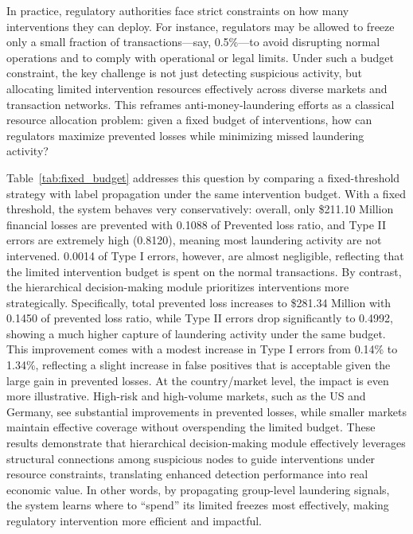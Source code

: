 In practice, regulatory authorities face strict constraints on how many interventions they can deploy. For instance, regulators may be allowed to freeze only a small fraction of transactions—say, 0.5\%—to avoid disrupting normal operations and to comply with operational or legal limits. Under such a budget constraint, the key challenge is not just detecting suspicious activity, but allocating limited intervention resources effectively across diverse markets and transaction networks. This reframes anti-money-laundering efforts as a classical resource allocation problem: given a fixed budget of interventions, how can regulators maximize prevented losses while minimizing missed laundering activity?

Table~\ref{tab:fixed_budget} addresses this question by comparing a fixed-threshold strategy with label propagation under the same intervention budget. With a fixed threshold, the system behaves very conservatively: overall, only \$211.10 Million financial losses are prevented with 0.1088 of Prevented loss ratio, and Type II errors are extremely high (0.8120), meaning most laundering activity are not intervened. 0.0014 of Type I errors, however, are almost negligible, reflecting that the limited intervention budget is spent on the normal transactions. By contrast, the hierarchical decision-making module prioritizes interventions more strategically. Specifically, total prevented loss increases to \$281.34 Million with 0.1450 of prevented loss ratio, while Type II errors drop significantly to 0.4992, showing a much higher capture of laundering activity under the same budget. This improvement comes with a modest increase in Type I errors from 0.14\% to 1.34\%, reflecting a slight increase in false positives that is acceptable given the large gain in prevented losses. At the country/market level, the impact is even more illustrative. High-risk and high-volume markets, such as the US and Germany, see substantial improvements in prevented losses, while smaller markets maintain effective coverage without overspending the limited budget. These results demonstrate that hierarchical decision-making module effectively leverages structural connections among suspicious nodes to guide interventions under resource constraints, translating enhanced detection performance into real economic value. In other words, by propagating group-level laundering signals, the system learns where to “spend” its limited freezes most effectively, making regulatory intervention more efficient and impactful.



